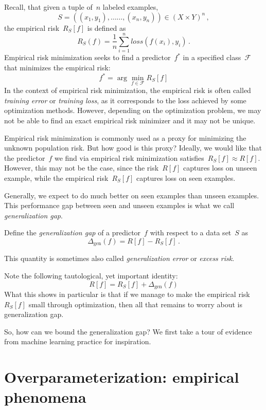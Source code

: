 \documentclass{tufte-book}
\begin{document}
Recall, that given a tuple of~\(n\) labeled examples, \[
S=((x_1,y_1),\dots\dots,(x_n,y_n))\in(X\times Y)^n\,,
\] the empirical risk~\(R_S[f]\) is defined as \[
R_{S}(f) = \frac{1}{n}\sum_{i=1}^{n}\mathit{loss}(f(x_i),y_i)\,.
\] Empirical risk minimization seeks to find a predictor~\(f^*\) in a
specified class~\(\mathcal{F}\) that minimizes the empirical risk: \[
f^* = \arg\min_{f\in\mathcal{F}} R_S[f]
\] In the context of empirical risk minimization, the empirical risk is
often called \emph{training error} or \emph{training loss}, as it
corresponds to the loss achieved by some optimization methods. However,
depending on the optimization problem, we may not be able to find an
exact empirical risk minimizer and it may not be unique.

Empirical risk minimization is commonly used as a proxy for minimizing
the unknown population risk. But how good is this proxy? Ideally, we
would like that the predictor~\(f\) we find via empirical risk
minimization satisfies~\(R_S[f]\approx R[f].\) However, this may not be
the case, since the risk~\(R[f]\) captures loss on unseen example, while
the empirical risk~\(R_S[f]\) captures loss on seen examples.

Generally, we expect to do much better on seen examples than unseen
examples. This performance gap between seen and unseen examples is what
we call \emph{generalization gap}.

\begin{Definition}

Define the \emph{generalization gap} of a predictor~\(f\) with respect
to a data set~\(S\) as \[
\Delta_{\mathrm{gen}}(f) = R[f] - R_S[f]\,.
\]

\end{Definition}

This quantity is sometimes also called \emph{generalization error} or
\emph{excess risk}.

Note the following tautological, yet important identity: \[
R[f] = R_S[f] + \Delta_{\mathrm{gen}}(f)
\] What this shows in particular is that if we manage to make the
empirical risk~\(R_S[f]\) small through optimization, then all that
remains to worry about is generalization gap.

So, how can we bound the generalization gap? We first take a tour of
evidence from machine learning practice for inspiration.

\hypertarget{overparameterization-empirical-phenomena}{%
\section{Overparameterization: empirical
phenomena}\label{overparameterization-empirical-phenomena}}
\end{document}
